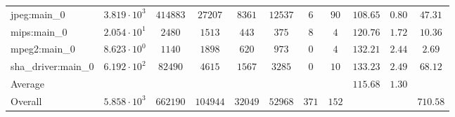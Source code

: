 \begin{tabular}{|l|c|c|c|c|c|c|c|c|c|c|}
jpeg:main\_0            & $ 3.819 \cdot 10^{3}  $ & $ 414883 $ & $ 27207  $ & $ 8361  $ & $ 12537 $ & $ 6   $ & $ 90  $ & $ 108.65      $ & $ 0.80    $ & $ 47.31   $ \\
mips:main\_0            & $ 2.054 \cdot 10^{1}  $ & $ 2480   $ & $ 1513   $ & $ 443   $ & $ 375   $ & $ 8   $ & $ 4   $ & $ 120.76      $ & $ 1.72    $ & $ 10.36   $ \\
mpeg2:main\_0           & $ 8.623 \cdot 10^{0}  $ & $ 1140   $ & $ 1898   $ & $ 620   $ & $ 973   $ & $ 0   $ & $ 4   $ & $ 132.21      $ & $ 2.44    $ & $ 2.69    $ \\
sha\_driver:main\_0     & $ 6.192 \cdot 10^{2}  $ & $ 82490  $ & $ 4615   $ & $ 1567  $ & $ 3285  $ & $ 0   $ & $ 10  $ & $ 133.23      $ & $ 2.49    $ & $ 68.12   $ \\
\hline
Average                 & $                     $ & $        $ & $        $ & $       $ & $       $ & $     $ & $     $ & $ 115.68      $ & $ 1.30    $ & $         $ \\
\hline
Overall                 & $ 5.858 \cdot 10^{3}  $ & $ 662190 $ & $ 104944 $ & $ 32049 $ & $ 52968 $ & $ 371 $ & $ 152 $ & $             $ & $         $ & $ 710.58  $ \\
\hline
\end{tabular}
